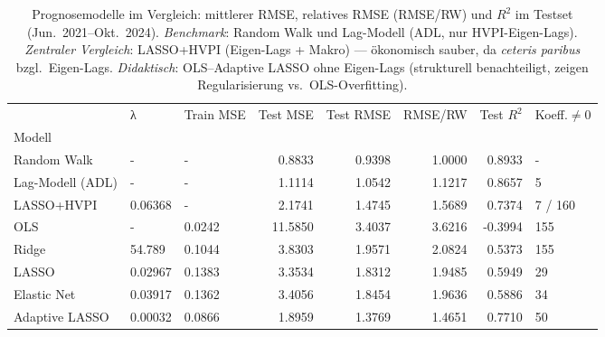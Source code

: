 \begin{table}
\caption{Prognosemodelle im Vergleich: mittlerer RMSE, relatives RMSE (RMSE/RW) und $R^2$ im Testset (Jun.~2021--Okt.~2024). \emph{Benchmark}: Random Walk und Lag-Modell (ADL, nur HVPI-Eigen-Lags). \emph{Zentraler Vergleich}: LASSO+HVPI (Eigen-Lags + Makro) — ökonomisch sauber, da \emph{ceteris paribus} bzgl.\ Eigen-Lags. \emph{Didaktisch}: OLS–Adaptive LASSO ohne Eigen-Lags (strukturell benachteiligt, zeigen Regularisierung vs.\ OLS-Overfitting).}
\label{tab:ergebnisse}
\begin{tabular}{lllrrrrl}
\toprule
 & λ & Train MSE & Test MSE & Test RMSE & RMSE/RW & Test $R^2$ & Koeff.$\neq$0 \\
Modell &  &  &  &  &  &  &  \\
\midrule
Random Walk & - & - & 0.8833 & 0.9398 & 1.0000 & 0.8933 & - \\
Lag-Modell (ADL) & - & - & 1.1114 & 1.0542 & 1.1217 & 0.8657 & 5 \\
\midrule
LASSO+HVPI & 0.06368 & - & 2.1741 & 1.4745 & 1.5689 & 0.7374 & 7 / 160 \\
\midrule
OLS & - & 0.0242 & 11.5850 & 3.4037 & 3.6216 & -0.3994 & 155 \\
Ridge & 54.789 & 0.1044 & 3.8303 & 1.9571 & 2.0824 & 0.5373 & 155 \\
LASSO & 0.02967 & 0.1383 & 3.3534 & 1.8312 & 1.9485 & 0.5949 & 29 \\
Elastic Net & 0.03917 & 0.1362 & 3.4056 & 1.8454 & 1.9636 & 0.5886 & 34 \\
Adaptive LASSO & 0.00032 & 0.0866 & 1.8959 & 1.3769 & 1.4651 & 0.7710 & 50 \\
\bottomrule
\end{tabular}
\end{table}
